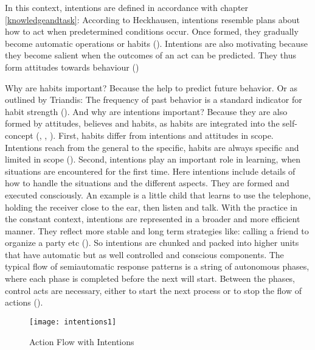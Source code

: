 In this context, intentions are defined in accordance with chapter \ref{knowledgeandtask}: According to Heckhausen, intentions resemble plans about how to act when predetermined conditions occur. Once formed, they gradually become automatic operations or habits (\cite{heckhausen1990intentional}). Intentions are also motivating because they become salient when the outcomes of an act can be predicted. They thus form attitudes towards behaviour (\cite{ouellette1998habit})

Why are habits important? Because the help to predict future behavior. Or as outlined by Triandis: The frequency of past behavior is a standard indicator for habit strength (\cite{triandis1979values}). And why are intentions important? Because they are also formed by attitudes, believes and habits, as habits are integrated into the self-concept (\cite{ouellette1998habit}, \cite{festinger1962theory}, \cite{bem1973self}). First, habits differ from intentions and attitudes in scope. Intentions reach from the general to the specific, habits are always specific and limited in scope (\cite{allport1935attitudes}). Second, intentions play an important role in learning, when situations are encountered for the first time. Here intentions include details of how to handle the situations and the different aspects. They are formed and executed consciously. An example is a little child that learns to use the telephone, holding the receiver close to the ear, then listen and talk. With the practice in the constant context, intentions are represented in a broader and more efficient manner. They reflect more stable and long term strategies like: calling a friend to organize a party etc (\cite{heckhausen1990intentional}). So intentions are chunked and packed into higher units that have automatic but as well controlled and conscious components. The typical flow of semiautomatic response patterns is a string of autonomous phases, where each phase is completed before the next will start. Between the phases, control acts are necessary, either to start the next process or to stop the flow of actions (\cite{bargh1989conditional}). 

\begin{figure}[ht]
	\centering
  \texttt{[image: intentions1]}
	\caption{Action Flow with Intentions}
	\label{fig10}
\end{figure}

